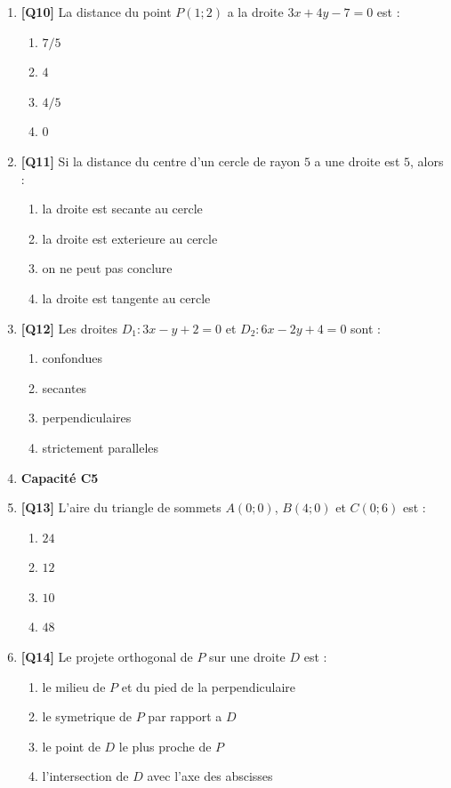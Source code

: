 \begin{enumerate}
\item \textbf{[Q10]} La distance du point $P(1 ; 2)$ a la droite $3x + 4y - 7 = 0$ est :
  \begin{enumerate}[label=\Alph*.]
    \item $7/5$
    \item $4$
    \item $4/5$
    \item $0$
  \end{enumerate}

\item \textbf{[Q11]} Si la distance du centre d'un cercle de rayon $5$ a une droite est $5$, alors :
  \begin{enumerate}[label=\Alph*.]
    \item la droite est secante au cercle
    \item la droite est exterieure au cercle
    \item on ne peut pas conclure
    \item la droite est tangente au cercle
  \end{enumerate}

\item \textbf{[Q12]} Les droites $D_1 : 3x - y + 2 = 0$ et $D_2 : 6x - 2y + 4 = 0$ sont :
  \begin{enumerate}[label=\Alph*.]
    \item confondues
    \item secantes
    \item perpendiculaires
    \item strictement paralleles
  \end{enumerate}

\item[] \textbf{Capacité C5}

\item \textbf{[Q13]} L'aire du triangle de sommets $A(0 ; 0)$, $B(4 ; 0)$ et $C(0 ; 6)$ est :
  \begin{enumerate}[label=\Alph*.]
    \item $24$
    \item $12$
    \item $10$
    \item $48$
  \end{enumerate}

\item \textbf{[Q14]} Le projete orthogonal de $P$ sur une droite $D$ est :
  \begin{enumerate}[label=\Alph*.]
    \item le milieu de $P$ et du pied de la perpendiculaire
    \item le symetrique de $P$ par rapport a $D$
    \item le point de $D$ le plus proche de $P$
    \item l'intersection de $D$ avec l'axe des abscisses
  \end{enumerate}


\end{enumerate}
